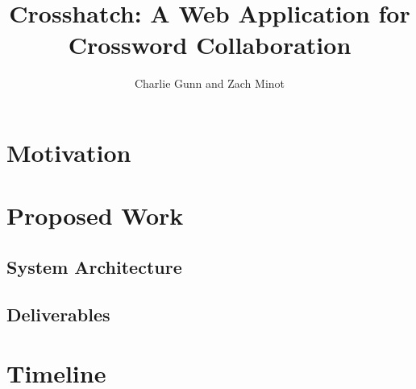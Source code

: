 \documentclass{article}
\author{Charlie Gunn and Zach Minot}
\title{Crosshatch: A Web Application for Crossword Collaboration}
\begin{document}
\maketitle

\section{Motivation}

\section{Proposed Work}
\subsection{System Architecture}
\subsection{Deliverables}

\section{Timeline}

\newpage


\end{document}

